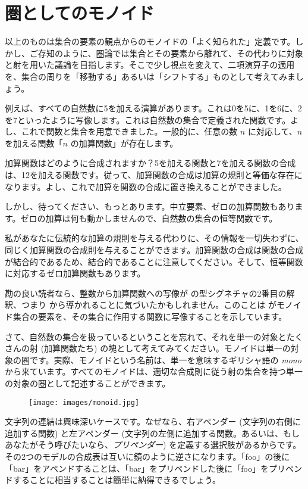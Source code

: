 \section{圏としてのモノイド}

以上のものは集合の要素の観点からのモノイドの「よく知られた」定義です。しかし、ご存知のように、圏論では集合とその要素から離れて、その代わりに対象と射を用いた議論を目指します。そこで少し視点を変えて、二項演算子の適用を、集合の周りを「移動する」あるいは「シフトする」ものとして考えてみましょう。

例えば、すべての自然数に5を加える演算があります。これは0を5に、1を6に、2を7といったように写像します。これは自然数の集合で定義された関数です。よし、これで関数と集合を用意できました。一般的に、任意の数 $n$ に対応して、$n$ を加える関数「$n$ の加算関数」が存在します。

加算関数はどのように合成されますか？5を加える関数と7を加える関数の合成は、12を加える関数です。従って、加算関数の合成は加算の規則と等価な存在になります。よし、これで加算を関数の合成に置き換えることができました。

しかし、待ってください、もっとあります。中立要素、ゼロの加算関数もあります。ゼロの加算は何も動かしませんので、自然数の集合の恒等関数です。

私があなたに伝統的な加算の規則を与える代わりに、その情報を一切失わずに、同じく加算関数の合成則を与えることができます。加算関数の合成は関数の合成が結合的であるため、結合的であることに注意してください。そして、恒等関数に対応するゼロ加算関数もあります。

勘の良い読者なら、整数から加算関数への写像が  の型シグネチャの2番目の解釈、つまり  から導かれることに気づいたかもしれません。このことは  がモノイド集合の要素を、その集合に作用する関数に写像することを示しています。

さて、自然数の集合を扱っているということを忘れて、それを単一の対象とたくさんの射 (加算関数たち) の塊として考えてみてください。モノイドは単一の対象の圏です。実際、モノイドという名前は、単一を意味するギリシャ語の \emph{mono} から来ています。すべてのモノイドは、適切な合成則に従う射の集合を持つ単一の対象の圏として記述することができます。

\begin{figure}[H]
  \centering
  \texttt{[image: images/monoid.jpg]}
\end{figure}

\noindent
文字列の連結は興味深いケースです。なぜなら、右アペンダー (文字列の右側に追加する関数) と左アペンダー (文字列の左側に追加する関数。あるいは、もしあなたがそう呼びたいなら、\emph{プリペンダー}) を定義する選択肢があるからです。その2つのモデルの合成表は互いに鏡のように逆さになります。「foo」の後に「bar」をアペンドすることは、「bar」をプリペンドした後に「foo」をプリペンドすることに相当することは簡単に納得できるでしょう。


